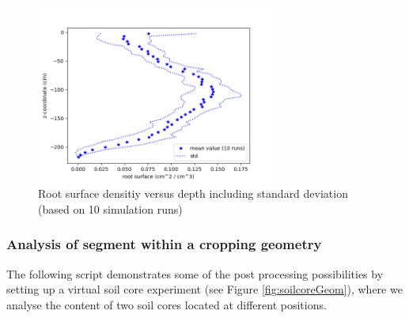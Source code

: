 \begin{figure}
\centering
\includegraphics[width=0.7\textwidth]{figures/topics_postprocessing.png} 
\caption{Root surface densitiy versus depth including standard deviation (based on 10 simulation runs) } \label{fig:topics_postprocessing}
\end{figure}




\subsubsection*{Analysis of segment within a cropping geometry}

The following script demonstrates some of the post processing possibilities by setting up a virtual soil core experiment (see Figure \ref{fig:soilcoreGeom}), where we analyse the content of two soil cores located at different positions.



